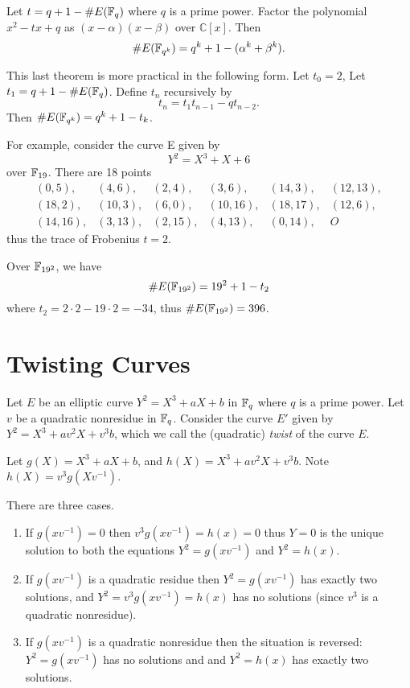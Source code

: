 \begin{theorem}
[Weil] Let $t = q + 1 - \#E(\mathbb{F}_q)$
where $q$ is a prime power.
Factor the polynomial $x^2 - t x + q$ as $(x-\alpha)(x-\beta)$ over
$\mathbb{C}[x]$.
Then
\[ \#E(\mathbb{F}_{q^k}) = q^k + 1 - (\alpha^k + \beta^k) .\]
\end{theorem}

This last theorem is more practical in the following form. Let $t_0 = 2$,
Let $t_1 = q + 1 - \#E(\mathbb{F}_q)$.
Define $t_n$ recursively by
\[ t_n = t_1 t_{n-1} - q t_{n-2} .\]
Then $\#E(\mathbb{F}_{q^k}) = q^k + 1 - t_k$.

For example, consider the curve E\cite{bk} given by
\[ Y^2 = X^3 + X + 6 \]
over $\mathbb{F}_{19}$. There are 18 points
\[
\begin{array}{llllll}
(0,5), & (4,6), & (2,4), & (3,6), & (14,3), & (12,13), \\
(18,2), & (10,3), & (6,0), & (10,16), & (18, 17), & (12,6), \\
(14,16), & (3,13), & (2,15), & (4,13), & (0,14), & O
\end{array}
\]
thus the trace of Frobenius $t = 2$.

Over $\mathbb{F}_{{19}^2}$, we have
\[
\#E(\mathbb{F}_{{19}^2}) = 19^2 + 1 - t_2
\]
where $t_2 = 2\cdot 2 - 19 \cdot 2 = -34$, thus
$\#E(\mathbb{F}_{{19}^2}) = 396$.

\section {Twisting Curves}

Let $E$ be an elliptic curve $Y^2 = X^3 + a X + b$ in $\mathbb{F}_q$ where
$q$ is a prime power.
Let $v$ be a quadratic nonresidue in $\mathbb{F}_q$.
Consider
the curve $E'$ given by $Y^2 = X^3 + a v^2 X + v^3 b$,
which we call the (quadratic) \emph{twist} of the curve $E$.

Let $g(X) = X^3 + a X + b$, and $h(X) = X^3 + a v^2 X + v^3 b$.
Note $h(X) = v^3 g(Xv^{-1})$.

There are three cases.

\begin{enumerate}
\item
If $g(xv^{-1}) = 0$ then $v^3g(xv^{-1}) = h(x) = 0$ thus
$Y = 0$ is the unique solution to both the
equations $Y^2 = g(xv^{-1})$ and $Y^2 = h(x)$.
\item
If $g(xv^{-1})$ is a quadratic residue then $Y^2 = g(xv^{-1})$
has exactly two solutions,
and $Y^2 = v^3 g(xv^{-1}) = h(x)$ has no solutions (since $v^3$
is a quadratic nonresidue).
\item
If $g(xv^{-1})$ is a quadratic nonresidue then the situation is reversed:
$Y^2 = g(xv^{-1})$ has no solutions and
and $Y^2 = h(x)$ has exactly two solutions.
\end{enumerate}

